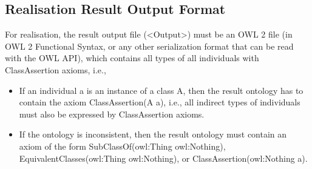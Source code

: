 \documentclass{article}
\begin{document}
\subsection{Realisation Result Output Format}
For realisation, the result output file (\textless Output\textgreater{}) must be an OWL 2 file (in OWL 2 Functional Syntax, or any other serialization format that can be read with the OWL API), which contains all types of all individuals with ClassAssertion axioms, i.e.,
\begin{itemize}
\item If an individual a is an instance of a class A, then the result ontology has to contain the axiom ClassAssertion(A a), i.e., all indirect types of individuals must also be expressed by ClassAssertion axioms.
\item If the ontology is inconsistent, then the result ontology must contain an axiom of the form SubClassOf(owl:Thing owl:Nothing), EquivalentClasses(owl:Thing owl:Nothing), or ClassAssertion(owl:Nothing a).
\end{itemize}
\end{document}
